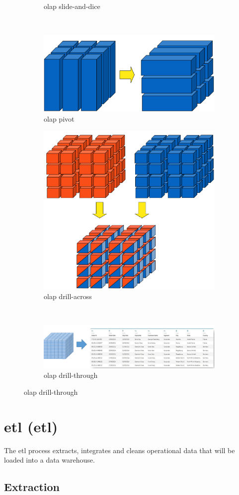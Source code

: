 \begin{figure}[ht]
\begin{subfigure}{.33\textwidth}
        \caption{\ac{olap} slide-and-dice}
    \end{subfigure}
    \\
    \begin{subfigure}{.5\textwidth}
        \centering
        \includegraphics[width=.35\linewidth]{img/olap_pivot.png}
        \caption{\ac{olap} pivot}
    \end{subfigure}
    \begin{subfigure}{.5\textwidth}
        \centering
        \includegraphics[width=.35\linewidth]{img/olap_drillacross.png}
        \caption{\ac{olap} drill-across}
    \end{subfigure}
    \\
    \begin{subfigure}{\textwidth}
        \centering
        \includegraphics[width=.60\linewidth]{img/olap_drillthrough.png}
        \caption{\ac{olap} drill-through}
    \end{subfigure}
\end{figure}



\section{\Acl{etl} (\Ac{etl})}
The \Ac{etl} process extracts, integrates and cleans operational data that will be loaded into a data warehouse.


\subsection{Extraction}

